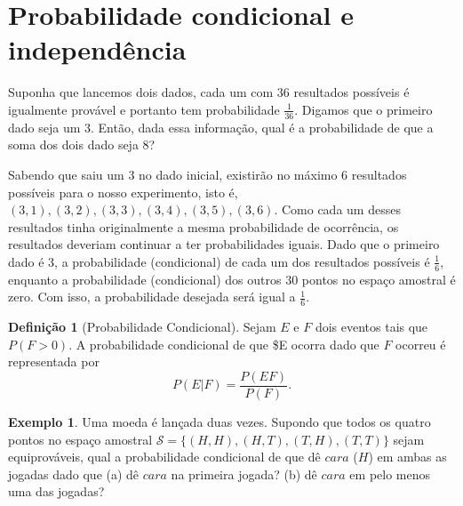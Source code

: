 \documentclass[]{book}
\theoremstyle{definition}
\newtheorem{definition}{Definição}[chapter]
\theoremstyle{definition}
\newtheorem{example}{Exemplo}[chapter]
\theoremstyle{definition}
\theoremstyle{remark}
\begin{document}
\hypertarget{probabilidade-condicional-e-independuxeancia}{%
\section{Probabilidade condicional e independência}\label{probabilidade-condicional-e-independuxeancia}}

Suponha que lancemos dois dados, cada um com 36 resultados possíveis é igualmente provável e portanto tem probabilidade \(\frac{1}{36}\).
Digamos que o primeiro dado seja um 3.
Então, dada essa informação, qual é a probabilidade de que a soma dos dois dado seja 8?

Sabendo que saiu um 3 no dado inicial, existirão no máximo 6 resultados possíveis para o nosso experimento, isto é, \((3,1) ,(3,2) ,(3,3) ,(3,4) ,(3,5) ,(3,6)\).
Como cada um desses resultados tinha originalmente a mesma probabilidade de ocorrência, os resultados deveriam continuar a ter probabilidades iguais.
Dado que o primeiro dado é 3, a probabilidade (condicional) de cada um dos resultados possíveis é \(\frac{1}{6}\), enquanto a probabilidade (condicional) dos outros 30 pontos no espaço amostral é zero.
Com isso, a probabilidade desejada será igual a \(\frac{1}{6}\).

\begin{definition}[Probabilidade Condicional]
\protect\hypertarget{def:defProbCond}{}{\label{def:defProbCond} \iffalse (Probabilidade Condicional) \fi{} }Sejam \(E\) e \(F\) dois eventos tais que \(P(F>0)\).
A probabilidade condicional de que \$E ocorra dado que \(F\) ocorreu é representada por
\begin{equation}
P(E|F) = \frac{P(EF)}{P(F)}.
\label{eq:condicional}
\end{equation}
\end{definition}

\begin{example}
\protect\hypertarget{exm:unnamed-chunk-117}{}{\label{exm:unnamed-chunk-117} }Uma moeda é lançada duas vezes.
Supondo que todos os quatro pontos no espaço amostral \(\mathcal{S} = \{(H,H), (H,T), (T,H), (T,T)\}\) sejam equiprováveis, qual a probabilidade condicional de que dê \(cara\) (\(H\)) em ambas as jogadas dado que (a) dê \(cara\) na primeira jogada? (b) dê \(cara\) em pelo menos uma das jogadas?
\end{example}
\end{document}
